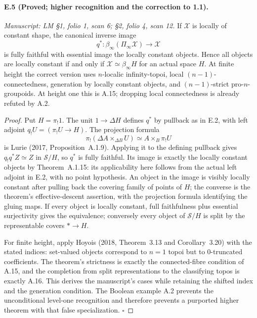 \paragraph{E.5 (Proved; higher recognition and the correction to 1.1).}
\textit{Manuscript: LM \S1, folio 1, scan 6; \S2, folio 4, scan 12.}
If $\mathcal X$ is locally of constant shape, the canonical inverse image
\[
 q^*:\beta_\infty(\Pi_\infty\mathcal X)\longrightarrow\mathcal X
\]
is fully faithful with essential image the locally constant objects. Hence all objects are locally constant if and only if $\mathcal X\simeq\beta_\infty H$ for an actual space $H$. At finite height the correct version uses $n$-localic infinity-topoi, local $(n-1)$-connectedness, generation by locally constant objects, and $(n-1)$-strict pro-$n$-groupoids. At height one this is A.15; dropping local connectedness is already refuted by A.2.
\begin{proof}
Put $H=\pi_!1$. The unit $1\to\Delta H$ defines $q^*$ by pullback as in E.2, with left adjoint $q_!U=(\pi_!U\to H)$. The projection formula
\[
 \pi_!(\Delta A\times_{\Delta B}U)
                      \simeq A\times_B\pi_!U
\]
is Lurie (2017, Proposition~A.1.9). Applying it to the defining pullback gives $q_!q^*Z\simeq Z$ in $\mathcal S/H$, so $q^*$ is fully faithful. Its image is exactly the locally constant objects by Theorem~A.1.15: its applicability here follows from the actual left adjoint in E.2, with no point hypothesis. An object in the image is visibly locally constant after pulling back the covering family of points of $H$; the converse is the theorem's effective-descent assertion, with the projection formula identifying the gluing maps. If every object is locally constant, full faithfulness plus essential surjectivity gives the equivalence; conversely every object of $\mathcal S/H$ is split by the representable covers $*\to H$.

For finite height, apply Hoyois (2018, Theorem~3.13 and Corollary~3.20) with the stated indices: set-valued objects correspond to $n=1$ topoi but to $0$-truncated coefficients. The theorem's strictness is exactly the connected-fibre condition of A.15, and the completion from split representations to the classifying topos is exactly A.16. This derives the manuscript's cases while retaining the shifted index and the generation condition. The Boolean example A.2 prevents the unconditional level-one recognition and therefore prevents a purported higher theorem with that false specialization. \hfill$\square$
\end{proof}

